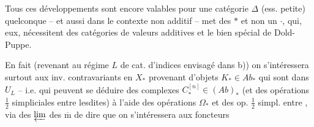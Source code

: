Tous ces développements sont encore
valables pour une catégorie $\Delta$ (ess. petite)
quelconque -- et aussi dans le contexte
non additif --   met des
$\ast$ et non un $\cdot$, qui, eux, nécessitent
des catégories de valeurs additives et le
 bien spécial de Dold-Puppe.

En fait (revenant au régime $L$
de cat. d'indices envisagé dans b))
on s'intéressera surtout aux
inv. contravariants en $X_{\ast}$ provenant
d'objets $K_{\ast}\in\mathit{Ab}_{\ast}$ qui sont dans $U_L$ --
i.e. qui peuvent se déduire des
complexes $C_{\ast}^{[n]}\in(\mathit{Ab})_{\ast}$ (et des opérations
$\tfrac12$ simpliciales entre lesdites) à l'aide des
opérations $\Omega_{\ast}$  
et des op. $\tfrac12$ simpl. entre , via des
 $\varprojlim$ des $\overline{\mathrm m}$ de
dire que  on
s'intéressera aux
foncteurs 

